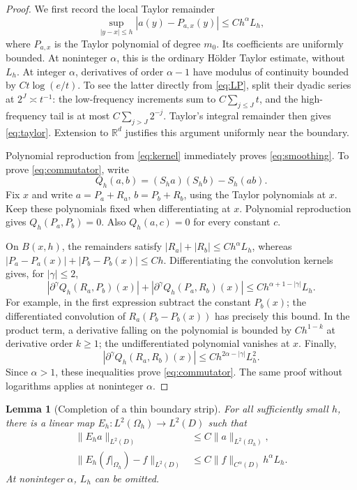 \documentclass[11pt]{article}
\newtheorem{lemma}[theorem]{Lemma}
\theoremstyle{remark}
\newcommand{\R}{\mathbb R}
\begin{document}
\begin{proof}
We first record the local Taylor remainder
\begin{equation}\label{eq:taylor}
\sup_{|y-x|\leq h}|a(y)-P_{a,x}(y)|
\leq C h^\alpha L_h,
\end{equation}
where \(P_{a,x}\) is the Taylor polynomial of degree \(m_0\).
Its coefficients are uniformly bounded. At noninteger \(\alpha\),
this is the ordinary H\"older Taylor estimate, without \(L_h\).
At integer \(\alpha\), derivatives of order \(\alpha-1\) have
modulus of continuity bounded by \(Ct\log(e/t)\). To see the latter
directly from \eqref{eq:LP}, split their dyadic series at
\(2^J\asymp t^{-1}\): the low-frequency increments sum to
\(C\sum_{j\leq J}t\), and the high-frequency tail is at most
\(C\sum_{j>J}2^{-j}\). Taylor's integral remainder then gives
\eqref{eq:taylor}. Extension to \(\R^d\) justifies this argument
uniformly near the boundary.

Polynomial reproduction from \eqref{eq:kernel} immediately proves
\eqref{eq:smoothing}. To prove \eqref{eq:commutator}, write
\[
Q_h(a,b)=(S_h a)(S_h b)-S_h(ab).
\]
Fix \(x\) and write \(a=P_a+R_a\), \(b=P_b+R_b\), using the Taylor
polynomials at \(x\). Keep these polynomials fixed when differentiating
at \(x\). Polynomial reproduction gives \(Q_h(P_a,P_b)=0\).
Also \(Q_h(a,c)=0\) for every constant \(c\).

On \(B(x,h)\), the remainders satisfy
\(|R_a|+|R_b|\leq Ch^\alpha L_h\), whereas
\(|P_a-P_a(x)|+|P_b-P_b(x)|\leq Ch\).
Differentiating the convolution kernels gives, for \(|\gamma|\leq2\),
\[
|\partial^\gamma Q_h(R_a,P_b)(x)|
+
|\partial^\gamma Q_h(P_a,R_b)(x)|
\leq C h^{\alpha+1-|\gamma|}L_h.
\]
For example, in the first expression subtract the constant \(P_b(x)\);
the differentiated convolution of
\(R_a(P_b-P_b(x))\) has precisely this bound. In the product term,
a derivative falling on the polynomial is bounded by
\(Ch^{1-k}\) at derivative order \(k\geq1\); the undifferentiated
polynomial vanishes at \(x\). Finally,
\[
|\partial^\gamma Q_h(R_a,R_b)(x)|
\leq C h^{2\alpha-|\gamma|}L_h^2.
\]
Since \(\alpha>1\), these inequalities prove
\eqref{eq:commutator}. The same proof without logarithms applies
at noninteger \(\alpha\).
\end{proof}

\begin{lemma}[Completion of a thin boundary strip]\label{lem:extension}
For all sufficiently small \(h\), there is a linear map
\(E_h:L^2(\Omega_h)\to L^2(D)\) such that
\begin{align}
\|E_h a\|_{L^2(D)}&\leq C\|a\|_{L^2(\Omega_h)},\label{eq:E-stable}\\
\|E_h(f|_{\Omega_h})-f\|_{L^2(D)}
&\leq C\|f\|_{C^\alpha(D)}h^\alpha L_h.
\label{eq:E-approx}
\end{align}
At noninteger \(\alpha\), \(L_h\) can be omitted.
\end{lemma}
\end{document}
